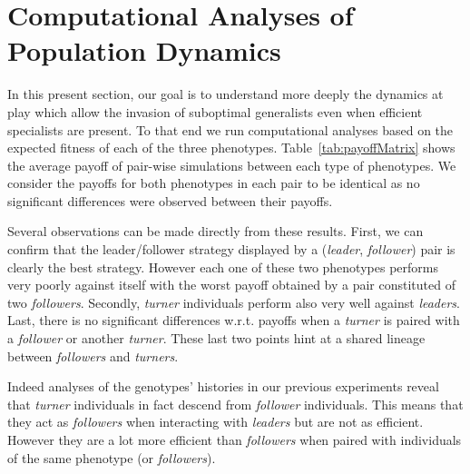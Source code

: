 \section{Computational Analyses of Population Dynamics}
  In this present section, our goal is to understand more deeply the dynamics at play which allow the invasion of suboptimal generalists even when efficient specialists are present. To that end we run computational analyses based on the expected fitness of each of the three phenotypes. Table~\ref{tab:payoffMatrix} shows the average payoff of pair-wise simulations between each type of phenotypes. We consider the payoffs for both phenotypes in each pair to be identical as no significant differences were observed between their payoffs.

  \begin{table}[h]
    \caption{\textbf{Payoff matrix for pair-wise simulations of each phenotype.} Average payoffs of each phenotype against every phenotype in a pair-wise simulation. Each pair was evaluated $10$ times in order to decrease the stochastic effects of the initial conditions (i.e. random positions of the targets).}
    \label{tab:payoffMatrix}
  \end{table}

  Several observations can be made directly from these results. First, we can confirm that the leader/follower strategy displayed by a (\emph{leader}, \emph{follower}) pair is clearly the best strategy. However each one of these two phenotypes performs very poorly against itself with the worst payoff obtained by a pair constituted of two \emph{followers}. Secondly, \emph{turner} individuals perform also very well against \emph{leaders}. Last, there is no significant differences w.r.t. payoffs when a \emph{turner} is paired with a \emph{follower} or another \emph{turner}. These last two points hint at a shared lineage between \emph{followers} and \emph{turners}. 

  Indeed analyses of the genotypes' histories in our previous experiments reveal that \emph{turner} individuals in fact descend from \emph{follower} individuals. This means that they act as \emph{followers} when interacting with \emph{leaders} but are not as efficient. However they are a lot more efficient than \emph{followers} when paired with individuals of the same phenotype (or \emph{followers}).


